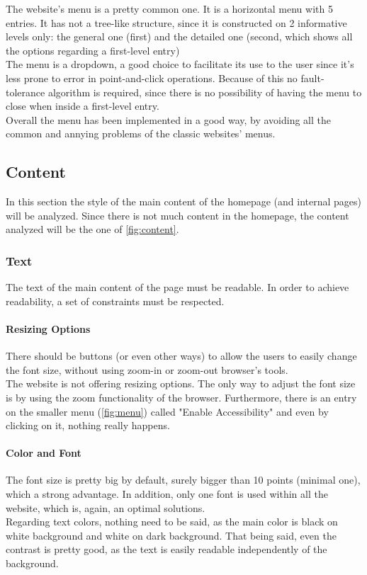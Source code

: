 The website's menu is a pretty common one. It is a horizontal menu with 5 entries. 
It has not a tree-like structure, since it is constructed on 2 informative levels only: the general one (first) and the detailed one (second, which shows all the options regarding a first-level entry)\\
The menu is a dropdown, a good choice to facilitate its use to the user since it's less prone to error in point-and-click operations. 
Because of this no fault-tolerance algorithm is required, since there is no possibility of having the menu to close when inside a first-level entry.\\
Overall the menu has been implemented in a good way, by avoiding all the common and annying problems of the classic websites' menus.

\subsection{Content}
In this section the style of the main content of the homepage (and internal pages) will be analyzed. Since there is not much content in the homepage, the content analyzed will be the one of \cref{fig:content}.

\subsubsection{Text}
The text of the main content of the page must be readable. 
In order to achieve readability, a set of constraints must be respected.

\paragraph{Resizing Options}
There should be buttons (or even other ways) to allow the users to easily change the font size, without using zoom-in or zoom-out browser's tools.\\

The website is not offering resizing options. The only way to adjust the font size is by using the zoom functionality of the browser. 
Furthermore, there is an entry on the smaller menu (\cref{fig:menu}) called "Enable Accessibility" and even by clicking on it, nothing really happens.

\paragraph{Color and Font}
The font size is pretty big by default, surely bigger than 10 points (minimal one), which a strong advantage. In addition, only one font is used within all the website, which is, again, an optimal solutions.\\
Regarding text colors, nothing need to be said, as the main color is black on white background and white on dark background. That being said, even the contrast is pretty good, as the text is easily readable independently of the background.

